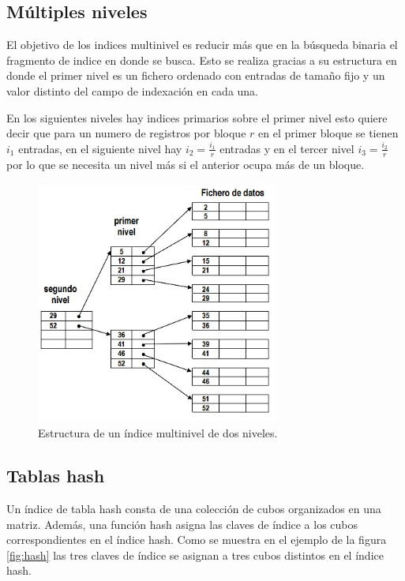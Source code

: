 \documentclass[12pt, titlepage]{article}
\begin{document}
	\subsection{Múltiples niveles}
	El objetivo de los indices multinivel es reducir más que en la búsqueda binaria el fragmento de indice en donde se busca. Esto se realiza gracias a su estructura en donde el primer nivel es un fichero ordenado con entradas de tamaño fijo y un valor distinto del campo de indexación en cada una.
	
	En los siguientes niveles hay indices primarios sobre el primer nivel esto quiere decir que para un numero de registros por bloque $r$ en el primer bloque se tienen $i_{1}$ entradas, en el siguiente nivel hay $i_{2}= \frac{i_{1}}{r}$ entradas y en el tercer nivel $i_{3}= \frac{i_{2}}{r}$ por lo que se necesita un nivel más si el anterior ocupa más de un bloque.
	
	\begin{figure}[H]
		\begin{center}
			\includegraphics[width=8cm, height=8cm]{img/multinivel.jpg}
			\caption{Estructura de un índice multinivel de dos niveles.}
			\label{fig:mul}
		\end{center}
	\end{figure}
	\subsection{Tablas hash}
	Un índice de tabla hash consta de una colección de cubos organizados en una matriz. Además, una función hash asigna las claves de índice a los cubos correspondientes en el índice hash. Como se muestra en el ejemplo de la figura \ref{fig:hash} las tres claves de índice se asignan a tres cubos distintos en el índice hash. \cite{WEB}
	
\end{document}
